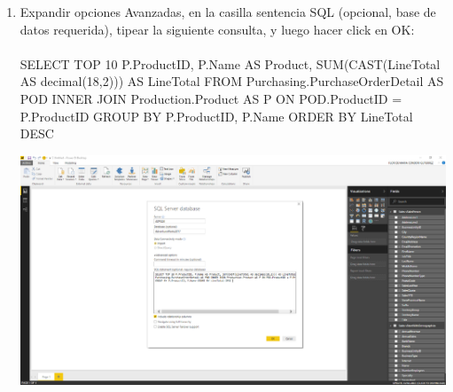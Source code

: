 \begin{enumerate}[1.]
	\item Expandir opciones Avanzadas, en la casilla sentencia SQL (opcional, base de datos requerida), tipear la siguiente consulta, y luego hacer click en OK:
	\\
	\\SELECT TOP 10 P.ProductID, P.Name AS Product, SUM(CAST(LineTotal AS decimal(18,2))) AS LineTotal FROM 	Purchasing.PurchaseOrderDetail AS POD INNER JOIN Production.Product AS P ON POD.ProductID = P.ProductID GROUP BY P.ProductID, P.Name ORDER BY LineTotal DESC

	\begin{center}
	\includegraphics[width=16cm]{./Imagenes/13} 
	\end{center}

\end{enumerate}




